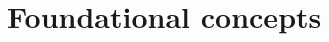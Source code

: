 \documentclass[output=book,
  nonflat,
  modfonts,
  colorlinks,citecolor=brown,
  showindex,
		  ]{langsci/langscibook}
\begin{document}
 
 
 
 

\maketitle                
\frontmatter

\tableofcontents
 
% 
%  
\mainmatter     
 

\part{Foundational concepts}\label{unit:1}
\end{document}
